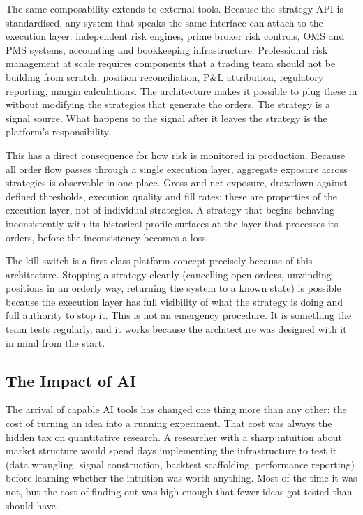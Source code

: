 \documentclass[
  11pt,
]{article}
\begin{document}
The same composability extends to external tools. Because the strategy
API is standardised, any system that speaks the same interface can
attach to the execution layer: independent risk engines, prime broker
risk controls, OMS and PMS systems, accounting and bookkeeping
infrastructure. Professional risk management at scale requires
components that a trading team should not be building from scratch:
position reconciliation, P\&L attribution, regulatory reporting, margin
calculations. The architecture makes it possible to plug these in
without modifying the strategies that generate the orders. The strategy
is a signal source. What happens to the signal after it leaves the
strategy is the platform's responsibility.

This has a direct consequence for how risk is monitored in production.
Because all order flow passes through a single execution layer,
aggregate exposure across strategies is observable in one place. Gross
and net exposure, drawdown against defined thresholds, execution quality
and fill rates: these are properties of the execution layer, not of
individual strategies. A strategy that begins behaving inconsistently
with its historical profile surfaces at the layer that processes its
orders, before the inconsistency becomes a loss.

The kill switch is a first-class platform concept precisely because of
this architecture. Stopping a strategy cleanly (cancelling open
orders, unwinding positions in an orderly way, returning the system to a
known state) is possible because the execution layer has full
visibility of what the strategy is doing and full authority to stop it.
This is not an emergency procedure. It is something the team tests
regularly, and it works because the architecture was designed with it in
mind from the start.

\subsection{The Impact of AI}\label{the-impact-of-ai}

The arrival of capable AI tools has changed one thing more than any
other: the cost of turning an idea into a running experiment. That cost
was always the hidden tax on quantitative research. A researcher with a
sharp intuition about market structure would spend days implementing the
infrastructure to test it (data wrangling, signal construction,
backtest scaffolding, performance reporting) before learning whether
the intuition was worth anything. Most of the time it was not, but the
cost of finding out was high enough that fewer ideas got tested than
should have.
\end{document}
